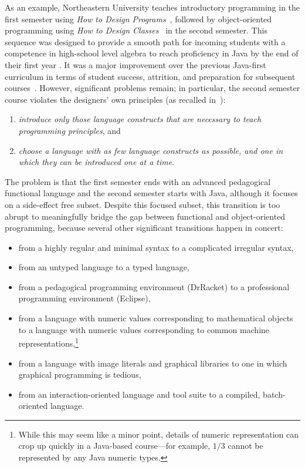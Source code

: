 \documentclass[submission,copyright]{eptcs}
\begin{document}
As an example, Northeastern University teaches introductory programming
in the first semester using \emph{How to Design
  Programs}~\cite{dvanhorn:Felleisen2001How}, followed by
object-oriented programming using \emph{How to Design
  Classes}~\cite{local:htdc} in the second semester.  This sequence
was designed to provide a smooth path for incoming students with
 a competence in high-school level algebra to reach
proficiency in Java by the end of their first year
\cite{dvanhorn:Felleisen2004Structure}.  It was a major improvement
over the previous Java-first curriculum in terms of student success,
attrition, and preparation for subsequent
courses~\cite{dvanhorn:Proulx2006Design}.  However, significant
problems remain; in particular, the second semester course violates
the designers' own principles (as recalled
in~\cite{dvanhorn:Bloch2000Scheme}):
%
\begin{enumerate}
\item \emph{introduce only those language constructs that are necessary to
  teach programming principles}, and
\item \emph{choose a language with as
  few language constructs as possible, and one in which they can be
  introduced one at a time}.
\end{enumerate}

The problem is that the first semester ends with an advanced
pedagogical functional language and the second semester starts with
Java, although it focuses on a side-effect free subset.  Despite this focused
subset, this transition is too abrupt to meaningfully bridge the gap
between functional and object-oriented programming, because
several other significant transitions happen in concert:
\begin{itemize}
\item from a highly regular and minimal syntax to a complicated
  irregular syntax,

\item from an untyped language to a typed language,

\item from a pedagogical programming environment (DrRacket) to a professional
programming environment (Eclipse),

\item from a language with numeric values corresponding to
  mathematical objects to a language with numeric values corresponding
  to common machine representations,\footnote{While this may seem like
    a minor point, details of numeric representation can crop up
    quickly in a Java-based course---for example, $1/3$ cannot be
    represented by any Java numeric types.}

\item from a language with image literals and graphical libraries to
  one in which graphical programming is tedious,

\item from an interaction-oriented language and tool suite to a
  compiled, batch-oriented language.
\end{itemize}
\end{document}
